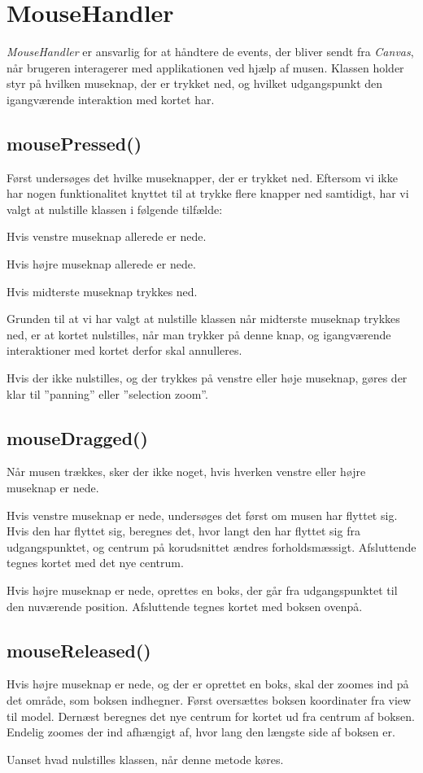 \section{MouseHandler}
\emph{MouseHandler} er ansvarlig for at håndtere de events, der bliver sendt fra \emph{Canvas}, når brugeren interagerer med applikationen ved hjælp af musen. Klassen holder styr på hvilken museknap, der er trykket ned, og hvilket udgangspunkt den igangværende interaktion med kortet har.

\subsection{mousePressed()}
Først undersøges det hvilke museknapper, der er trykket ned. Eftersom vi ikke har nogen funktionalitet knyttet til at trykke flere knapper ned samtidigt, har vi valgt at nulstille klassen i følgende tilfælde:

\begin{list}
	\item Hvis venstre museknap allerede er nede.
	\item Hvis højre museknap allerede er nede.
	\item Hvis midterste museknap trykkes ned.
\end{list}

Grunden til at vi har valgt at nulstille klassen når midterste museknap trykkes ned, er at kortet nulstilles, når man trykker på denne knap, og igangværende interaktioner med kortet derfor skal annulleres.

Hvis der ikke nulstilles, og der trykkes på venstre eller høje museknap, gøres der klar til ''panning'' eller ''selection zoom''.

\subsection{mouseDragged()}
Når musen trækkes, sker der ikke noget, hvis hverken venstre eller højre museknap er nede.

Hvis venstre museknap er nede, undersøges det først om musen har flyttet sig. Hvis den har flyttet sig, beregnes det, hvor langt den har flyttet sig fra udgangspunktet, og centrum på korudsnittet ændres forholdsmæssigt. Afsluttende tegnes kortet med det nye centrum.

Hvis højre museknap er nede, oprettes en boks, der går fra udgangspunktet til den nuværende position. Afsluttende tegnes kortet med boksen ovenpå.

\subsection{mouseReleased()}
Hvis højre museknap er nede, og der er oprettet en boks, skal der zoomes ind på det område, som boksen indhegner. Først oversættes boksen koordinater fra view til model. Dernæst beregnes det nye centrum for kortet ud fra centrum af boksen. Endelig zoomes der ind afhængigt af, hvor lang den længste side af boksen er.

Uanset hvad nulstilles klassen, når denne metode køres.